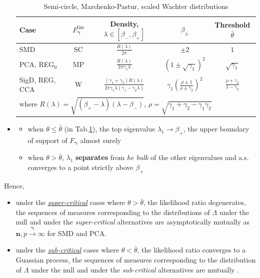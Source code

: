 \documentclass[twoside]{article}
\begin{document}
\begin{itemize}
    \begin{table}[ht]
        \caption{Semi-circle, Marchenko-Pastur, scaled Wachter distributions}\label{tab:3classes_distributions}
        \footnotesize
        \begin{center}
          \begin{tabular}{lcccc}
            Case & $F^{\lim}_{\boldsymbol{\gamma}}$ & Density, $\lambda\in[\beta_{-},\beta_+]$ & $\beta_{\pm}$ & Threshold $\bar{\theta}$ \\
            \hline
            SMD & SC & $\frac{R(\lambda)}{2\pi}$ & $\pm 2$ & $1$\\
            PCA, REG$_0$ & MP & $\frac{R(\lambda)}{2\pi\gamma_1 \lambda}$ & $(1\pm \sqrt{\gamma_1})^2$ & $\sqrt{\gamma_1}$\\
            SigD, REG, CCA & W & $ \frac{(\gamma_1+\gamma_2)R(\lambda)}{2\pi\gamma_1 \lambda(\gamma_1-\gamma_2\lambda)} $ & $\gamma_1\left( \frac{\rho\pm 1}{\rho\pm \gamma_2}\right)^2$ & $\frac{\rho + \gamma_2}{1-\gamma_2}$ \\ \hline
            \multicolumn{5}{l}{where $R(\lambda)= \sqrt{(\beta_+-\lambda)(\lambda-\beta_-)}$, $\rho = \sqrt{\gamma_1+\gamma_2-\gamma_1\gamma_2}$}
          \end{tabular}
        \end{center}
    \end{table}
    \item {}
    \begin{itemize}
        \item when $\theta\leq \bar{\theta}$ (in Tab.\ref{tab:3classes_distributions}), the top eigenvalue $\lambda_1 \rightarrow \beta_+$, the upper boundary of support of $F_{\boldsymbol{\gamma}}$ almost surely
        \item when $\theta > \bar{\theta}$, $\lambda_1$ \textbf{separates} from \textit{he bulk} of the other eigenvalues and a.s. converges to a point strictly above $\beta_+$
    \end{itemize}
\end{itemize}

Hence, 
\begin{itemize}
    \item under the \textit{\underline{super-critical}} cases where $\theta > \bar{\theta}$, the likelihood ratio degenerates, the sequences of measures corresponding to the distributions of $\Lambda$ under the null and under the \textit{super-critical} alternatives are asymptotically mutually  as $\mathbf{n},p\xrightarrow{\boldsymbol{\gamma}}\infty$ for SMD and PCA.
    \item under the \textit{\underline{sub-critical}} cases where $\theta < \bar{\theta}$, the likelihood ratio converges to a Guassian process, the sequences of measures corresponding to the distribution of $\Lambda$ under the null and under the \textit{sub-critical} alternatives are mutually .
\end{itemize}
\end{document}
